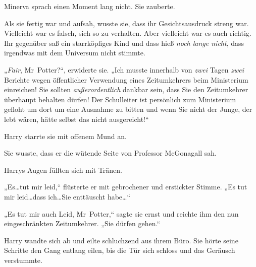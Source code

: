 Minerva sprach einen Moment lang nicht. Sie zauberte.

Als sie fertig war und aufsah, wusste sie, dass ihr Gesichtsausdruck streng war. Vielleicht war es falsch, sich so zu verhalten. Aber vielleicht war es auch richtig. Ihr gegenüber saß ein starrköpfiges Kind und dass hieß \emph{noch lange nicht}, dass irgendwas mit dem Universum nicht stimmte.

„\emph{Fair}, Mr~Potter?“, erwiderte sie. „Ich musste innerhalb von \emph{zwei} Tagen \emph{zwei} Berichte wegen öffentlicher Verwendung eines Zeitumkehrers beim Ministerium einreichen! Sie sollten \emph{außerordentlich} dankbar sein, dass Sie den Zeitumkehrer überhaupt behalten dürfen! Der Schulleiter ist persönlich zum Ministerium gefloht um dort um eine Ausnahme zu bitten und wenn Sie nicht der Junge, der lebt wären, hätte selbst das nicht ausgereicht!“

Harry starrte sie mit offenem Mund an.

Sie wusste, dass er die wütende Seite von Professor McGonagall sah.

Harrys Augen füllten sich mit Tränen.

„Es…tut mir leid,“ flüsterte er mit gebrochener und erstickter Stimme. „Es tut mir leid…dass ich…Sie enttäuscht habe…“

„Es tut mir auch Leid, Mr~Potter,“ sagte sie ernst und reichte ihm den nun eingeschränkten Zeitumkehrer. „Sie dürfen gehen.“

Harry wandte sich ab und eilte schluchzend aus ihrem Büro. Sie hörte seine Schritte den Gang entlang eilen, bis die Tür sich schloss und das Geräusch verstummte.

